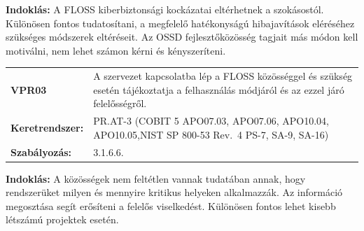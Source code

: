 \documentclass[12pt,magyar,a4paper,oneside]{scrreprt}
\begin{document}
\textbf{Indoklás: } A FLOSS kiberbiztonsági kockázatai eltérhetnek a
szokásostól. Különösen fontos tudatosítani, a megfelelő hatékonyságú
hibajavítások eléréséhez szükséges módszerek eltéréseit. Az OSSD
fejlesztőközösség tagjait más módon kell motiválni, nem lehet számon
kérni és kényszeríteni.

\begin{longtable}[]{@{}ll@{}}
\toprule
\endhead
\begin{minipage}[t]{0.16\columnwidth}\raggedright
\textbf{VPR03}\strut
\end{minipage} & \begin{minipage}[t]{0.79\columnwidth}\raggedright
A szervezet kapcsolatba lép a FLOSS közösséggel és szükség esetén
tájékoztatja a felhasználás módjáról és az ezzel járó
felelősségről.\strut
\end{minipage}\tabularnewline
\begin{minipage}[t]{0.16\columnwidth}\raggedright
\textbf{Keretrendszer:}\strut
\end{minipage} & \begin{minipage}[t]{0.79\columnwidth}\raggedright
PR.AT-3 (COBIT 5 APO07.03, APO07.06, APO10.04, APO10.05,NIST SP 800-53
Rev.~4 PS-7, SA-9, SA-16)\strut
\end{minipage}\tabularnewline
\begin{minipage}[t]{0.16\columnwidth}\raggedright
\textbf{Szabályozás:}\strut
\end{minipage} & \begin{minipage}[t]{0.79\columnwidth}\raggedright
3.1.6.6.\strut
\end{minipage}\tabularnewline
\bottomrule
\end{longtable}

\textbf{Indoklás: } A közösségek nem feltétlen vannak tudatában annak,
hogy rendszerüket milyen és mennyire kritikus helyeken alkalmazzák. Az
információ megosztása segít erősíteni a felelős viselkedést. Különösen
fontos lehet kisebb létszámú projektek esetén.
\end{document}
